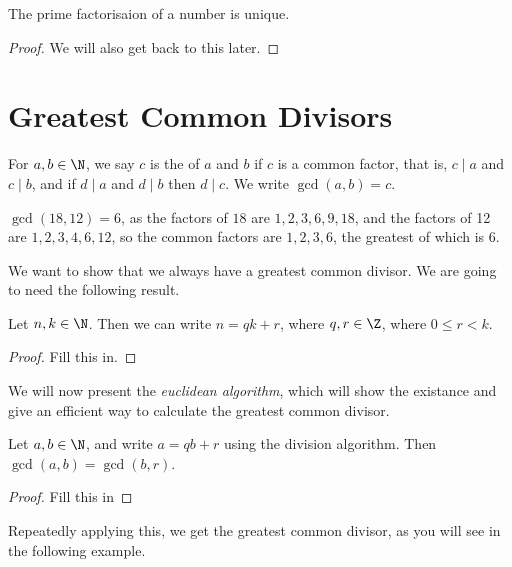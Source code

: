 \documentclass[a4]{scrartcl}
\begin{document}
\begin{proposition}
	The prime factorisaion of a number is unique.
\end{proposition}
\begin{proof}
	We will also get back to this later.
\end{proof}

\section{Greatest Common Divisors}
\vspace{0.5\baselineskip}
\begin{definition}
	For $a, b \in \N$, we say $c$ is the  of $a$ and $b$ if $c$ is a common factor, that is, $c \mid a$ and $c \mid b$, and if $d \mid a$ and $d \mid b$ then $d \mid c$. We write $\gcd(a, b) = c$.
\end{definition}

\begin{example}
	$\gcd(18, 12) = 6$, as the factors of $18$ are $1, 2, 3, 6, 9, 18$, and the factors of 12 are $1, 2, 3, 4, 6, 12$, so the common factors are $1, 2, 3, 6$, the greatest of which is $6$.
\end{example}

We want to show that we always have a greatest common divisor. We are going to need the following result.

\begin{proposition}
	Let $n, k \in \N$. Then we can write $n = qk + r$, where $q, r \in \Z$, where $0 \leq r < k$. 
\end{proposition}
\begin{proof}
	Fill this in.
\end{proof}

We will now present the \emph{euclidean algorithm}, which will show the existance and give an efficient way to calculate the greatest common divisor.

\begin{theorem}
Let $a, b \in \N$, and write $a = qb + r$ using the division algorithm. Then $\gcd(a, b) = \gcd(b, r)$.
\end{theorem}
\begin{proof}
	Fill this in
\end{proof}

Repeatedly applying this, we get the greatest common divisor, as you will see in the following example.
\end{document}
